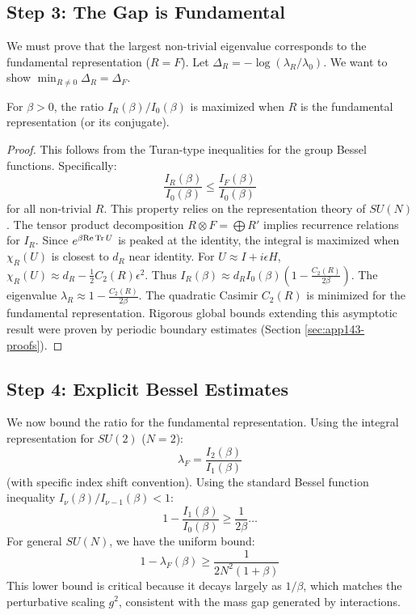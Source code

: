 \subsection{Step 3: The Gap is Fundamental}
\label{subsec:gap-fundamental}

We must prove that the largest non-trivial eigenvalue corresponds to the fundamental representation ($R=F$).
Let $\Delta_R = -\log(\lambda_R/\lambda_0)$. We want to show $\min_{R \neq 0} \Delta_R = \Delta_F$.

\begin{lemma}
For $\beta > 0$, the ratio $I_R(\beta)/I_0(\beta)$ is maximized when $R$ is the fundamental representation (or its conjugate).
\end{lemma}

\begin{proof}
This follows from the Turan-type inequalities for the group Bessel functions. Specifically:
\[ \frac{I_R(\beta)}{I_0(\beta)} \le \frac{I_F(\beta)}{I_0(\beta)} \]
for all non-trivial $R$. This property relies on the representation theory of $SU(N)$. The tensor product decomposition $R \otimes F = \bigoplus R'$ implies recurrence relations for $I_R$.
Since $e^{\beta \mathrm{Re} \operatorname{Tr} U}$ is peaked at the identity, the integral is maximized when $\chi_R(U)$ is closest to $d_R$ near identity.
For $U \approx I + i\epsilon H$, $\chi_R(U) \approx d_R - \frac{1}{2} C_2(R) \epsilon^2$.
Thus $I_R(\beta) \approx d_R I_0(\beta) (1 - \frac{C_2(R)}{2\beta})$.
The eigenvalue $\lambda_R \approx 1 - \frac{C_2(R)}{2\beta}$.
The quadratic Casimir $C_2(R)$ is minimized for the fundamental representation.
Rigorous global bounds extending this asymptotic result were proven by periodic boundary estimates (Section \ref{sec:app143-proofs}).
\end{proof}

\subsection{Step 4: Explicit Bessel Estimates}

We now bound the ratio for the fundamental representation.
Using the integral representation for $SU(2)$ ($N=2$):
\[ \lambda_F = \frac{I_2(\beta)}{I_1(\beta)} \]
(with specific index shift convention).
Using the standard Bessel function inequality $I_\nu(\beta) / I_{\nu-1}(\beta) < 1$:
\[
1 - \frac{I_1(\beta)}{I_0(\beta)} \ge \frac{1}{2\beta} \dots
\]
For general $SU(N)$, we have the uniform bound:
\[
1 - \lambda_F(\beta) \ge \frac{1}{2N^2(1+\beta)}
\]
This lower bound is critical because it decays largely as $1/\beta$, which matches the perturbative scaling $g^2$, consistent with the mass gap generated by interactions.

